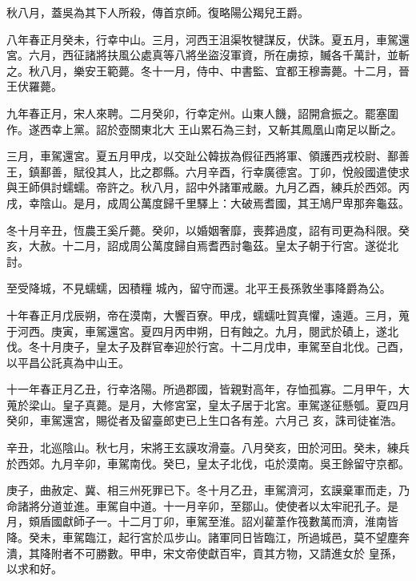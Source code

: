 \begin{pinyinscope}
 秋八月，蓋吳為其下人所殺，傳首京師。復略陽公羯兒王爵。



 八年春正月癸未，行幸中山。三月，河西王沮渠牧犍謀反，伏誅。夏五月，車駕還宮。六月，西征諸將扶風公處真等八將坐盜沒軍資，所在虜掠，贓各千萬計，並斬之。秋八月，樂安王範薨。冬十一月，侍中、中書監、宜都王穆壽薨。十二月，晉王伏羅薨。



 九年春正月，宋人來聘。二月癸卯，行幸定州。山東人饑，詔開倉振之。罷塞圍作。遂西幸上黨。詔於壺關東北大
 王山累石為三封，又斬其鳳凰山南足以斷之。



 三月，車駕還宮。夏五月甲戌，以交趾公韓拔為假征西將軍、領護西戎校尉、鄯善王，鎮鄯善，賦役其人，比之郡縣。六月辛酉，行幸廣德宮。丁卯，悅般國遣使求與王師俱討蠕蠕。帝許之。秋八月，詔中外諸軍戒嚴。九月乙酉，練兵於西郊。丙戌，幸陰山。是月，成周公萬度歸千里驛上：大破焉耆國，其王鳩尸卑那奔龜茲。



 冬十月辛丑，恆農王奚斤薨。癸卯，以婚姻奢靡，喪葬過度，詔有司更為科限。癸亥，大赦。十二月，詔成周公萬度歸自焉耆西討龜茲。皇太子朝于行宮。遂從北討。



 至受降城，不見蠕蠕，因積糧
 城內，留守而還。北平王長孫敦坐事降爵為公。



 十年春正月戊辰朔，帝在漠南，大饗百寮。甲戌，蠕蠕吐賀真懼，遠遁。三月，蒐于河西。庚寅，車駕還宮。夏四月丙申朔，日有蝕之。九月，閱武於磧上，遂北伐。冬十月庚子，皇太子及群官奉迎於行宮。十二月戊申，車駕至自北伐。己酉，以平昌公託真為中山王。



 十一年春正月乙丑，行幸洛陽。所過郡國，皆親對高年，存恤孤寡。二月甲午，大蒐於梁山。皇子真薨。是月，大修宮室，皇太子居于北宮。車駕遂征懸瓠。夏四月癸卯，車駕還宮，賜從者及留臺郎吏已上生口各有差。六月己
 亥，誅司徒崔浩。



 辛丑，北巡陰山。秋七月，宋將王玄謨攻滑臺。八月癸亥，田於河田。癸未，練兵於西郊。九月辛卯，車駕南伐。癸巳，皇太子北伐，屯於漠南。吳王餘留守京都。



 庚子，曲赦定、冀、相三州死罪已下。冬十月乙丑，車駕濟河，玄謨棄軍而走，乃命諸將分道並進。車駕自中道。十一月辛卯，至鄒山。使使者以太牢祀孔子。是月，頞盾國獻師子一。十二月丁卯，車駕至淮。詔刈雚葦作筏數萬而濟，淮南皆降。癸未，車駕臨江，起行宮於瓜步山。諸軍同日皆臨江，所過城邑，莫不望塵奔潰，其降附者不可勝數。甲申，宋文帝使獻百牢，貢其方物，又請進女於
 皇孫，以求和好。




\end{pinyinscope}
